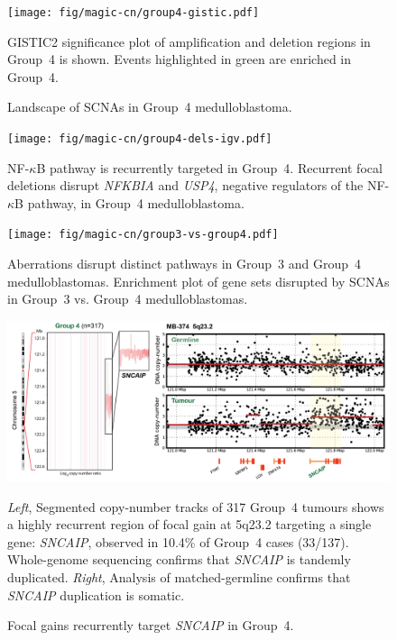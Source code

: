 \documentclass[11pt,letterpaper]{article}
\theoremstyle{definition}
\begin{document}
\clearpage

\begin{figure}[h]
	\begin{center}
		\texttt{[image: fig/magic-cn/group4-gistic.pdf]}
	\end{center}
	\caption{Landscape of SCNAs in Group~4 medulloblastoma.}
	GISTIC2 significance plot of amplification and deletion regions in Group~4 is shown. Events highlighted in green are enriched in Group~4.
	\label{fig:group4-gistic}
\end{figure}

\clearpage

\begin{figure}
	\centering
	\texttt{[image: fig/magic-cn/group4-dels-igv.pdf]}
	\caption{NF-$\kappa$B pathway is recurrently targeted in Group~4.
		Recurrent focal deletions disrupt \emph{NFKBIA} and \emph{USP4}, negative regulators of the NF-$\kappa$B pathway, in Group~4 medulloblastoma.}
	\label{fig:group4-dels-igv}
\end{figure}

\begin{figure}
	\centering
	\texttt{[image: fig/magic-cn/group3-vs-group4.pdf]}
	\caption{Aberrations disrupt distinct pathways in Group~3 and Group~4 medulloblastomas.
	Enrichment plot of gene sets disrupted by SCNAs in Group~3 vs. Group~4 medulloblastomas.}
	\label{fig:group3-vs-group4}
\end{figure}

\clearpage

\begin{figure}[h]
	\begin{center}
		\includegraphics[width=\textwidth]{fig/magic-cn/sncaip-gain.png}
	\end{center}
	\caption{Focal gains recurrently target \emph{SNCAIP} in Group~4.}
	\emph{Left}, Segmented copy-number tracks of 317 Group~4 tumours shows a highly recurrent region of focal gain at 5q23.2 targeting a single gene: \emph{SNCAIP}, observed in 10.4\% of Group~4 cases (33/137). Whole-genome sequencing confirms that \emph{SNCAIP} is tandemly duplicated. \emph{Right}, Analysis of matched-germline confirms that \emph{SNCAIP} duplication is somatic.
	\label{fig:sncaip-gain}
\end{figure}
\end{document}
